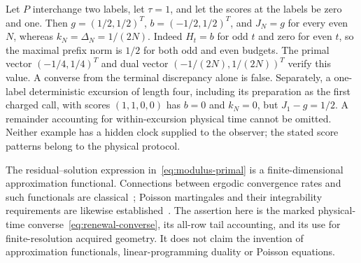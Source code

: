 \begin{remark}\label{rem:prefix-tail}
Let $P$ interchange two labels, let $\tau=1$, and let the scores at the labels be zero and one. Then $g=(1/2,1/2)^T$, $b=(-1/2,1/2)^T$, and $J_N=g$ for every even $N$, whereas $k_N=\Delta_N=1/(2N)$. Indeed $H_t=b$ for odd $t$ and zero for even $t$, so the maximal prefix norm is $1/2$ for both odd and even budgets. The primal vector $(-1/4,1/4)^T$ and dual vector $(-1/(2N),1/(2N))^T$ verify this value. A converse from the terminal discrepancy alone is false. Separately, a one-label deterministic excursion of length four, including its preparation as the first charged call, with scores $(1,1,0,0)$ has $b=0$ and $k_N=0$, but $J_1-g=1/2$. A remainder accounting for within-excursion physical time cannot be omitted. Neither example has a hidden clock supplied to the observer; the stated score patterns belong to the physical protocol.
\end{remark}

The residual--solution expression in~\eqref{eq:modulus-primal} is a finite-dimensional approximation functional. Connections between ergodic convergence rates and such functionals are classical~\cite{Shaw}; Poisson martingales and their integrability requirements are likewise established~\cite{GlynnInfanger}. The assertion here is the marked physical-time converse~\eqref{eq:renewal-converse}, its all-row tail accounting, and its use for finite-resolution acquired geometry. It does not claim the invention of approximation functionals, linear-programming duality or Poisson equations.
